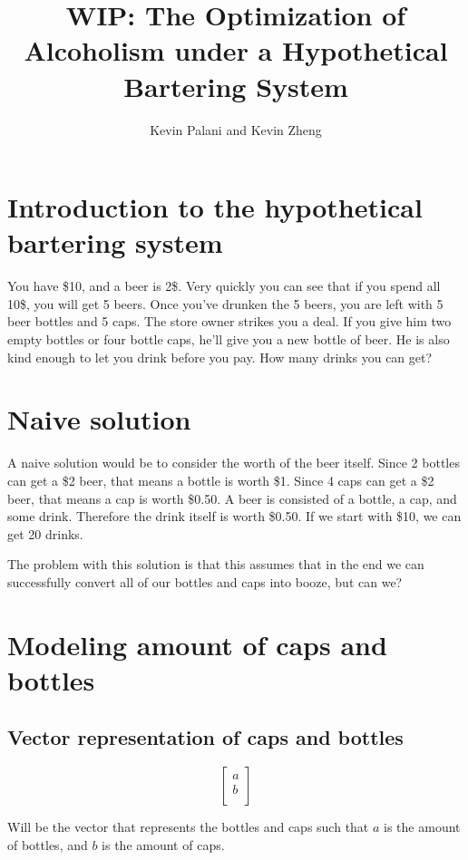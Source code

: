 \documentclass[letterpaper, 12pt]{article}
\title{WIP: The Optimization of Alcoholism under a Hypothetical Bartering System}
\author{Kevin Palani and Kevin Zheng}
\begin{document}
\maketitle
\tableofcontents
\section{Introduction to the hypothetical bartering system}
\par You have \$10, and a beer is 2\$.
Very quickly you can see that if you spend all 10\$, you will get 5 beers.
Once you've drunken the 5 beers, you are left with 5 beer bottles and 5 caps.
The store owner strikes you a deal.
If you give him two empty bottles or four bottle caps, he'll give you a new bottle of beer.
He is also kind enough to let you drink before you pay.
How many drinks you can get?
\section{Naive solution}
A naive solution would be to consider the worth of the beer itself.
Since 2 bottles can get a \$2 beer, that means a bottle is worth \$1.
Since 4 caps can get a \$2 beer, that means a cap is worth \$0.50.
A beer is consisted of a bottle, a cap, and some drink.
Therefore the drink itself is worth \$0.50.
If we start with \$10, we can get 20 drinks.

The problem with this solution is that this assumes that in the end we can successfully convert all of our bottles and caps into booze, but can we?
\section{Modeling amount of caps and bottles}
\subsection{Vector representation of caps and bottles}
\[
    \begin{bmatrix}
        a\\
        b\\
    \end{bmatrix}
\]
\par Will be the vector that represents the bottles and caps such that $a$ is the amount of bottles, and $b$ is the amount of caps.
\end{document}
